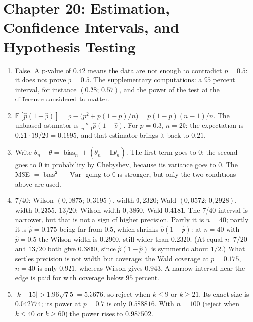\section*{Chapter 20: Estimation, Confidence Intervals, and Hypothesis Testing}
\begin{enumerate}[label=\textbf{20.\arabic*}]
  \item False. A p-value of $0.42$ means the data are not enough to contradict $p=0.5$;
        it does not prove $p=0.5$. The supplementary computations: a $95$ percent
        interval, for instance $(0.28;\,0.57)$, and the power of the test at the
        difference considered to matter.

  \item $\mathbb{E}[\hat p(1-\hat p)]=p-\bigl(p^{2}+p(1-p)/n\bigr)
        =p(1-p)(n-1)/n$. The unbiased estimator is
        $\frac{n}{n-1}\hat p(1-\hat p)$. For $p=0.3$, $n=20$: the expectation is
        $0.21\cdot19/20=0.1995$, and that estimator brings it back to $0.21$.

  \item Write $\hat\theta_{n}-\theta=\operatorname{bias}_{n}
        +(\hat\theta_{n}-\mathbb{E}\hat\theta_{n})$. The first term goes to $0$; the
        second goes to $0$ in probability by Chebyshev, because its variance goes to
        $0$. The MSE $=\operatorname{bias}^{2}+\operatorname{Var}$ going to $0$ is stronger,
        but only the two conditions above are used.

  \item 
$7/40$: Wilson $(0{,}0875;\,0{,}3195)$, width $0{,}2320$; Wald
        $(0{,}0572;\,0{,}2928)$, width $0{,}2355$. $13/20$: Wilson width $0{,}3860$,
        Wald $0.4181$. The $7/40$ interval is narrower, but that is not a sign of
        higher precision. Partly it is $n=40$; partly it is $\hat p=0.175$ being far
        from $0.5$, which shrinks $\hat p(1-\hat p)$: at $n=40$ with $\hat p=0.5$ the
        Wilson width is $0.2960$, still wider than $0.2320$. (At equal $n$, $7/20$ and
        $13/20$ both give $0.3860$, since $\hat p(1-\hat p)$ is symmetric about
        $1/2$.) What settles precision is not width but coverage: the Wald coverage
        at $p=0.175$, $n=40$ is only $0.921$, whereas Wilson gives $0.943$. A narrow
        interval near the edge is paid for with coverage below $95$ percent.

  \item $|k-15|>1.96\sqrt{7.5}=5.3676$, so reject when $k\le9$ or $k\ge21$.
        Its exact size is $0.042774$; its power at $p=0.7$ is only $0.588816$.
        With $n=100$ (reject when $k\le40$ or $k\ge60$) the power rises to $0.987502$.


\end{enumerate}
